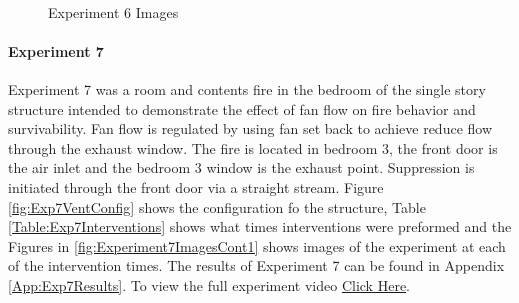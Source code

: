 \documentclass{article}
\begin{document}
\begin{figure}[H]
	\ContinuedFloat 
	\centering 
	 \ 
	\caption{Experiment 6 Images}
	\label{fig:Experiment6ImagesCont4} 
\end{figure}

\paragraph{Experiment 7}\mbox{}

Experiment 7 was a room and contents fire in the bedroom of the single story structure intended to demonstrate the effect of fan flow on fire behavior and survivability. Fan flow is regulated by using fan set back to achieve reduce flow through the exhaust window. The fire is located in bedroom 3, the front door is the air inlet and the bedroom 3 window is the exhaust point. Suppression is initiated through the front door via a straight stream. Figure \ref{fig:Exp7VentConfig} shows the configuration fo the structure, Table \ref{Table:Exp7Interventions} shows what times interventions were preformed and the Figures in \ref{fig:Experiment7ImagesCont1} shows images of the experiment at each of the intervention times. The results of Experiment 7 can be found in Appendix \ref{App:Exp7Results}. To view the full experiment video \href{https://youtu.be/PmMNYFz9DYU}{Click Here}.
\end{document}
